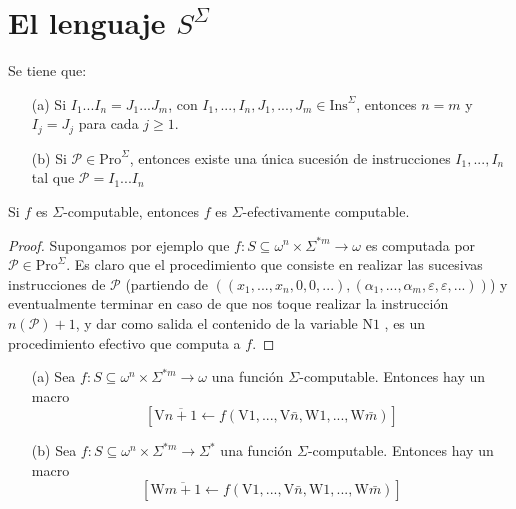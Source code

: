 \section{El lenguaje ${S}^{\Sigma}$}

  \begin{lemma} Se tiene que:
    \begin{itemize}
      \item[(a)]  Si $I_{1}...I_{n}=J_{1}...J_{m}$, con $ I_{1},...,I_{n},J_{1},...,J_{m}\in \mathrm{Ins}^{\Sigma }$,
                  entonces $n=m$ y $I_{j}=J_{j}$ para cada $j\geq 1$.
      \item[(b)]  Si $\mathcal{P}\in \mathrm{Pro}^{\Sigma }$, entonces existe una única sucesión de instrucciones
                  $I_{1},...,I_{n}$ tal que $\mathcal{P} =I_{1}...I_{n}$
    \end{itemize}
  \end{lemma}

  \begin{theorem}
    Si $f$ es $\Sigma $-computable, entonces $f$ es $\Sigma $-efectivamente computable.
  \begin{proof}
    Supongamos por ejemplo que $f:S\subseteq \omega ^{n}\times \Sigma ^{\ast m}\rightarrow \omega $ es computada por
    $\mathcal{P}\in \mathrm{Pro}^{\Sigma }$. Es claro que el procedimiento que consiste en realizar las sucesivas
    instrucciones de $\mathcal{P}$ (partiendo de $((x_{1},...,x_{n},0,0,...),( \alpha _{1},...,\alpha _{m},
    \varepsilon ,\varepsilon ,...))$) y eventualmente terminar en caso de que nos toque realizar la instrucción
    $n( \mathcal{P})+1$, y dar como salida el contenido de la variable $\mathrm{N}1$ , es un procedimiento efectivo
    que computa a $f$.
  \end{proof}
  \end{theorem}

  \begin{proposition}
    \begin{itemize}
      \item[(a)]  Sea $f:S\subseteq \omega ^{n}\times \Sigma ^{\ast m}\rightarrow \omega $ una función
                  $\Sigma $-computable. Entonces hay un macro
                  \[
                  \displaystyle \left[ \mathrm{V}\overline{n+1}\leftarrow f(\mathrm{V}1,...,\mathrm{V}\bar{n} ,
                  \mathrm{W}1,...,\mathrm{W}\bar{m})\right]
                  \]
      \item[(b)]  Sea $f:S\subseteq \omega ^{n}\times \Sigma ^{\ast m}\rightarrow \Sigma ^{\ast }$ una función
                  $\Sigma $-computable. Entonces hay un macro
                  \[
                  \displaystyle \left[ \mathrm{W}\overline{m+1}\leftarrow f(\mathrm{V}1,...,\mathrm{V}\bar{n} ,
                  \mathrm{W}1,...,\mathrm{W}\bar{m})\right]
                  \]
    \end{itemize}
  \end{proposition}

